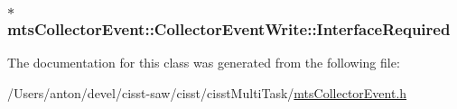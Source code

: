 \subsubsection[{Interface\+Required}]{$\ast$ mts\+Collector\+Event\+::\+Collector\+Event\+Write\+::\+Interface\+Required}\label{classmts_collector_event_1_1_collector_event_write_a4b474bb7e7316260c530ba3b496c78c3}


The documentation for this class was generated from the following file\+:\begin{DoxyCompactItemize}
\item 
/\+Users/anton/devel/cisst-\/saw/cisst/cisst\+Multi\+Task/\hyperlink{mts_collector_event_8h}{mts\+Collector\+Event.\+h}\end{DoxyCompactItemize}
